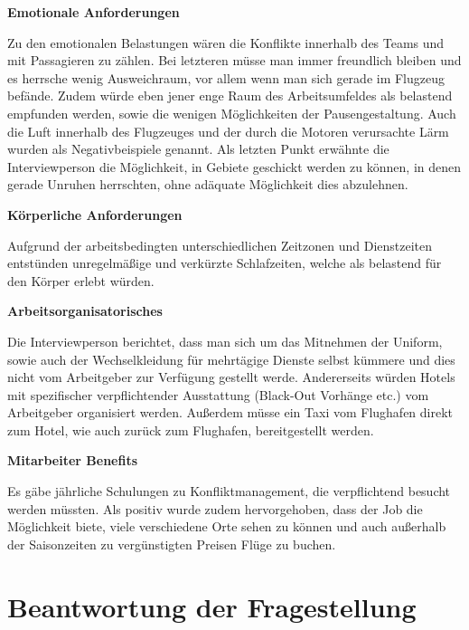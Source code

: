 \documentclass[12pt, a4paper]{article}
\begin{document}
\textbf{Emotionale Anforderungen}

Zu den emotionalen Belastungen wären die Konflikte innerhalb des Teams und mit Passagieren zu zählen.
Bei letzteren müsse man immer freundlich bleiben und es herrsche wenig Ausweichraum, vor allem wenn man sich gerade im Flugzeug befände.
Zudem würde eben jener enge Raum des Arbeitsumfeldes als belastend empfunden werden, sowie die wenigen Möglichkeiten der Pausengestaltung. 
Auch die Luft innerhalb des Flugzeuges und der durch die Motoren verursachte Lärm wurden als Negativbeispiele genannt. 
Als letzten Punkt erwähnte die Interviewperson die Möglichkeit, in Gebiete geschickt werden zu können, 
in denen gerade Unruhen herrschten, ohne adäquate Möglichkeit dies abzulehnen.

\textbf{Körperliche Anforderungen}

Aufgrund der arbeitsbedingten unterschiedlichen Zeitzonen und Dienstzeiten entstünden unregelmäßige und verkürzte Schlafzeiten,
welche als belastend für den Körper erlebt würden.

\textbf{Arbeitsorganisatorisches}

Die Interviewperson berichtet, dass man sich um das Mitnehmen der Uniform, sowie auch der Wechselkleidung für mehrtägige
Dienste selbst kümmere und dies nicht vom Arbeitgeber zur Verfügung gestellt werde.
Andererseits würden Hotels mit spezifischer verpflichtender Ausstattung (Black-Out Vorhänge etc.) vom Arbeitgeber organisiert werden.
Außerdem müsse ein Taxi vom Flughafen direkt zum Hotel, wie auch zurück zum Flughafen, bereitgestellt werden.

\textbf{Mitarbeiter Benefits}

Es gäbe jährliche Schulungen zu Konfliktmanagement, die verpflichtend besucht werden müssten.
Als positiv wurde zudem hervorgehoben, dass der Job die Möglichkeit biete, viele verschiedene Orte sehen zu können und
auch außerhalb der Saisonzeiten zu vergünstigten Preisen Flüge zu buchen.

\section{Beantwortung der Fragestellung}
\end{document}
